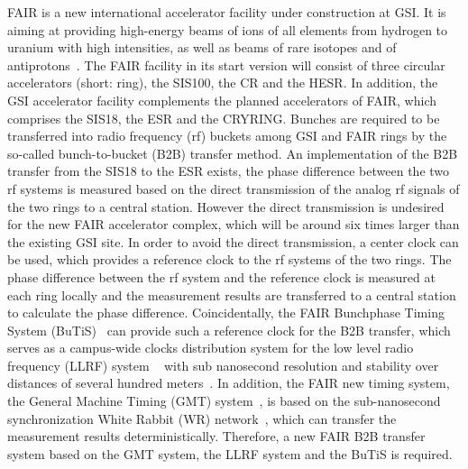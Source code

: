 FAIR is a new international accelerator facility under construction at GSI. It is aiming at providing high-energy beams of ions of all elements from hydrogen to uranium with high intensities, as well as beams of rare isotopes and of antiprotons~\cite{eschke_international_2005, noauthor_fair_2011}. The FAIR facility in its start version will consist of three circular accelerators (short: ring), the SIS100, the CR and the HESR. In addition, the GSI accelerator facility complements the planned accelerators of FAIR, which comprises the SIS18, the ESR and the CRYRING. Bunches are required to be transferred into radio frequency (rf) buckets among GSI and FAIR rings by the so-called bunch-to-bucket (B2B) transfer method. An implementation of the B2B transfer from the SIS18 to the ESR exists, the phase difference between the two rf systems is measured based on the direct transmission of the analog rf signals of the two rings to a central station. However the direct transmission is undesired for the new FAIR accelerator complex, which will be around six times larger than the existing GSI site. In order to avoid the direct transmission, a center clock can be used, which provides a reference clock to the rf systems of the two rings. The phase difference between the rf system and the reference clock is measured at each ring locally and the measurement results are transferred to a central station to calculate the phase difference. Coincidentally, the FAIR Bunchphase Timing System (BuTiS)~\cite{moritz_butisdevelopment_2006} can provide such a reference clock for the B2B transfer, which serves as a campus-wide clocks distribution system for the low level radio frequency (LLRF) system ~\cite{klingbeil_new_2011} with sub nanosecond resolution and stability over distances of several hundred meters~\cite{moritz_f-cs-rf-14e_2012}. In addition, the FAIR new timing system, the General Machine Timing (GMT) system~\cite{beck_general_2013}, is based on the sub-nanosecond synchronization White Rabbit (WR) network~\cite{beck_white_2011}, which can transfer the measurement results deterministically. Therefore, a new FAIR B2B transfer system based on the GMT system, the LLRF system and the BuTiS is required. 


